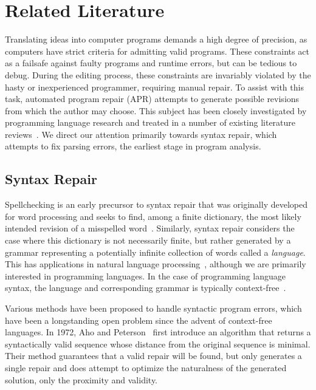 \chapter{\rm\bfseries Related Literature}
\label{ch:litreview}

Translating ideas into computer programs demands a high degree of precision, as computers have strict criteria for admitting valid programs. These constraints act as a failsafe against faulty programs and runtime errors, but can be tedious to debug. During the editing process, these constraints are invariably violated by the hasty or inexperienced programmer, requiring manual repair. To assist with this task, automated program repair (APR) attempts to generate possible revisions from which the author may choose. This subject has been closely investigated by programming language research and treated in a number of existing literature reviews~\cite{monperrus2018living, le2021automatic}. We direct our attention primarily towards syntax repair, which attempts to fix parsing errors, the earliest stage in program analysis.

\section{Syntax Repair}

Spellchecking is an early precursor to syntax repair that was originally developed for word processing and seeks to find, among a finite dictionary, the most likely intended revision of a misspelled word~\cite{kernighan1990spelling}. Similarly, syntax repair considers the case where this dictionary is not necessarily finite, but rather generated by a grammar representing a potentially infinite collection of words called a \textit{language}. This has applications in natural language processing~\cite{bryant2023grammatical}, although we are primarily interested in programming languages. In the case of programming language syntax, the language and corresponding grammar is typically context-free~\cite{chomsky1959algebraic}.

Various methods have been proposed to handle syntactic program errors, which have been a longstanding open problem since the advent of context-free languages. In 1972, Aho and Peterson~\cite{aho1972minimum} first introduce an algorithm that returns a syntactically valid sequence whose distance from the original sequence is minimal. Their method guarantees that a valid repair will be found, but only generates a single repair and does attempt to optimize the naturalness of the generated solution, only the proximity and validity.

